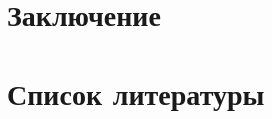 \documentclass[a4paper,12pt]{report}
\numberwithin{equation}{section}
\begin{document}
\clearpage
\section{Заключение}

\section{Список литературы}

%
\end{document}
